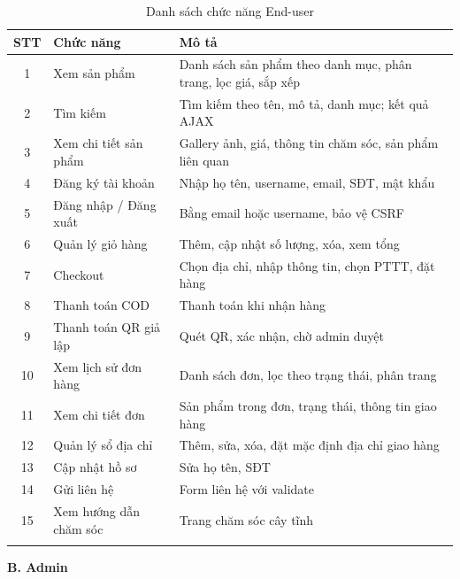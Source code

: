 \documentclass[a4paper]{article}
\begin{document}
\begin{longtable}{|c|p{4cm}|p{7.5cm}|}
\hline
\textbf{STT} & \textbf{Chức năng} & \textbf{Mô tả} \\
\hline
\endhead
1 & Xem sản phẩm & Danh sách sản phẩm theo danh mục, phân trang, lọc giá, sắp xếp \\
\hline
2 & Tìm kiếm & Tìm kiếm theo tên, mô tả, danh mục; kết quả AJAX \\
\hline
3 & Xem chi tiết sản phẩm & Gallery ảnh, giá, thông tin chăm sóc, sản phẩm liên quan \\
\hline
4 & Đăng ký tài khoản & Nhập họ tên, username, email, SĐT, mật khẩu \\
\hline
5 & Đăng nhập / Đăng xuất & Bằng email hoặc username, bảo vệ CSRF \\
\hline
6 & Quản lý giỏ hàng & Thêm, cập nhật số lượng, xóa, xem tổng \\
\hline
7 & Checkout & Chọn địa chỉ, nhập thông tin, chọn PTTT, đặt hàng \\
\hline
8 & Thanh toán COD & Thanh toán khi nhận hàng \\
\hline
9 & Thanh toán QR giả lập & Quét QR, xác nhận, chờ admin duyệt \\
\hline
10 & Xem lịch sử đơn hàng & Danh sách đơn, lọc theo trạng thái, phân trang \\
\hline
11 & Xem chi tiết đơn & Sản phẩm trong đơn, trạng thái, thông tin giao hàng \\
\hline
12 & Quản lý sổ địa chỉ & Thêm, sửa, xóa, đặt mặc định địa chỉ giao hàng \\
\hline
13 & Cập nhật hồ sơ & Sửa họ tên, SĐT \\
\hline
14 & Gửi liên hệ & Form liên hệ với validate \\
\hline
15 & Xem hướng dẫn chăm sóc & Trang chăm sóc cây tĩnh \\
\hline
\caption{Danh sách chức năng End-user}
\end{longtable}

\textbf{B. Admin}
\end{document}
